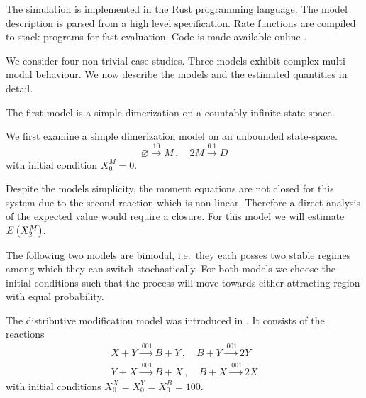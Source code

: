 The simulation is implemented in the Rust programming language.
The model description is parsed from a high level specification. 
Rate functions are compiled to stack programs for fast evaluation.
Code is made available online \parencite{cme-simulation-github}.

We consider four non-trivial case studies. Three models exhibit complex multi-modal behaviour.
We now describe the models and the estimated quantities in detail.

The first model is a simple dimerization on a countably infinite state-space.
\begin{model}[Dimerization]\label{model:dim2}
We first examine a simple dimerization model on an unbounded state-space.
	\[\varnothing\xrightarrow{10}M\,,\quad 2M\xrightarrow{0.1}D\]
with initial condition $X_0^M=0$.
\end{model}
Despite the models simplicity, the moment equations are not closed for this system
due to the second reaction which is non-linear.
Therefore a direct analysis of the expected value would require a closure.
For this model we will estimate ${E}\left(X^M_2\right)$.

The following two models are bimodal, i.e.\ they each posses two stable regimes
among which they can switch stochastically.
For both models we choose the initial conditions such that the process
will move towards either attracting region with equal probability.
\begin{model}\label{model:dm}
The distributive modification model was introduced in \parencite{cardelli2012cell}.
It consists of the reactions
\begin{gather*}
	X + Y \xrightarrow{\num{.001}} B + Y\,,\quad
	B + Y \xrightarrow{\num{.001}} 2 Y\\
	Y + X \xrightarrow{\num{.001}} B + X\,,\quad
	B + X \xrightarrow{\num{.001}} 2 X
\end{gather*}
with initial conditions $X^X_0=X^Y_0=X^B_0=100$.
\end{model}


